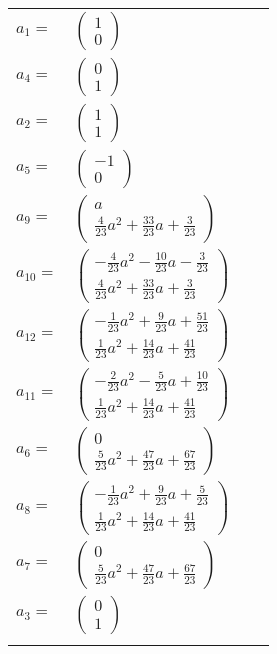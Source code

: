\documentclass[1p]{elsarticle_modified}
\theoremstyle{definition}
\begin{document}
\begin{tabular}{m{7pt} m{180pt} m{7pt} m{180pt} }
\flushright $a_{1}=$&$\begin{pmatrix}1\\0\end{pmatrix}$ \\
\flushright $a_{4}=$&$\begin{pmatrix}0\\1\end{pmatrix}$ \\
\flushright $a_{2}=$&$\begin{pmatrix}1\\1\end{pmatrix}$ \\
\flushright $a_{5}=$&$\begin{pmatrix}-1\\0\end{pmatrix}$ \\
\flushright $a_{9}=$&$\begin{pmatrix}a\\\frac{4}{23} a^2+\frac{33}{23} a+\frac{3}{23}\end{pmatrix}$ \\
\flushright $a_{10}=$&$\begin{pmatrix}-\frac{4}{23} a^2-\frac{10}{23} a-\frac{3}{23}\\\frac{4}{23} a^2+\frac{33}{23} a+\frac{3}{23}\end{pmatrix}$ \\
\flushright $a_{12}=$&$\begin{pmatrix}-\frac{1}{23} a^2+\frac{9}{23} a+\frac{51}{23}\\\frac{1}{23} a^2+\frac{14}{23} a+\frac{41}{23}\end{pmatrix}$ \\
\flushright $a_{11}=$&$\begin{pmatrix}-\frac{2}{23} a^2-\frac{5}{23} a+\frac{10}{23}\\\frac{1}{23} a^2+\frac{14}{23} a+\frac{41}{23}\end{pmatrix}$ \\
\flushright $a_{6}=$&$\begin{pmatrix}0\\\frac{5}{23} a^2+\frac{47}{23} a+\frac{67}{23}\end{pmatrix}$ \\
\flushright $a_{8}=$&$\begin{pmatrix}-\frac{1}{23} a^2+\frac{9}{23} a+\frac{5}{23}\\\frac{1}{23} a^2+\frac{14}{23} a+\frac{41}{23}\end{pmatrix}$ \\
\flushright $a_{7}=$&$\begin{pmatrix}0\\\frac{5}{23} a^2+\frac{47}{23} a+\frac{67}{23}\end{pmatrix}$ \\
\flushright $a_{3}=$&$\begin{pmatrix}0\\1\end{pmatrix}$\\&\end{tabular}
\end{document}
